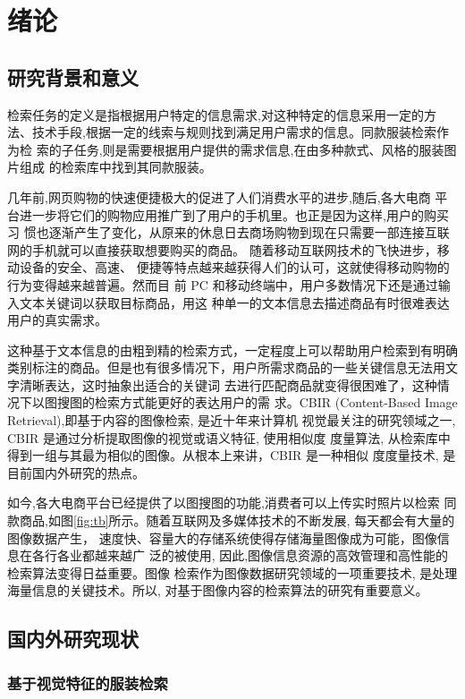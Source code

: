 \chapter{绪论}

\section{研究背景和意义}
检索任务的定义是指根据用户特定的信息需求,对这种特定的信息采用一定的方
法、技术手段,根据一定的线索与规则找到满足用户需求的信息。同款服装检索作为检
索的子任务,则是需要根据用户提供的需求信息,在由多种款式、风格的服装图片组成
的检索库中找到其同款服装。

几年前,网页购物的快速便捷极大的促进了人们消费水平的进步,随后,各大电商
平台进一步将它们的购物应用推广到了用户的手机里。也正是因为这样,用户的购买习
惯也逐渐产生了变化，从原来的休息日去商场购物到现在只需要一部连接互联网的手机就可以直接获取想要购买的商品。
随着移动互联网技术的飞快进步，移动设备的安全、高速、
便捷等特点越来越获得人们的认可，这就使得移动购物的行为变得越来越普遍。然而目
前 PC 和移动终端中，用户多数情况下还是通过输入文本关键词以获取目标商品，用这
种单一的文本信息去描述商品有时很难表达用户的真实需求。

这种基于文本信息的由粗到精的检索方式，一定程度上可以帮助用户检索到有明确
类别标注的商品。但是也有很多情况下，用户所需求商品的一些关键信息无法用文字清晰表达，这时抽象出适合的关键词
去进行匹配商品就变得很困难了，这种情况下以图搜图的检索方式能更好的表达用户的需
求。CBIR (Content-Based Image Retrieval)\cite{kato1992sketch},即基于内容的图像检索, 是近十年来计算机
视觉最关注的研究领域之一, CBIR 是通过分析提取图像的视觉或语义特征, 使用相似度
度量算法, 从检索库中得到一组与其最为相似的图像。从根本上来讲，CBIR 是一种相似
度度量技术, 是目前国内外研究的热点。

如今,各大电商平台已经提供了以图搜图的功能,消费者可以上传实时照片以检索
同款商品,如图\ref{fig:tb}所示。随着互联网及多媒体技术的不断发展, 每天都会有大量的图像数据产生，
速度快、容量大的存储系统使得存储海量图像成为可能，图像信息在各行各业都越来越广
泛的被使用, 因此,图像信息资源的高效管理和高性能的检索算法变得日益重要。图像
检索作为图像数据研究领域的一项重要技术, 是处理海量信息的关键技术。所以,
对基于图像内容的检索算法的研究有重要意义。

\section{国内外研究现状}

\subsection{基于视觉特征的服装检索}

